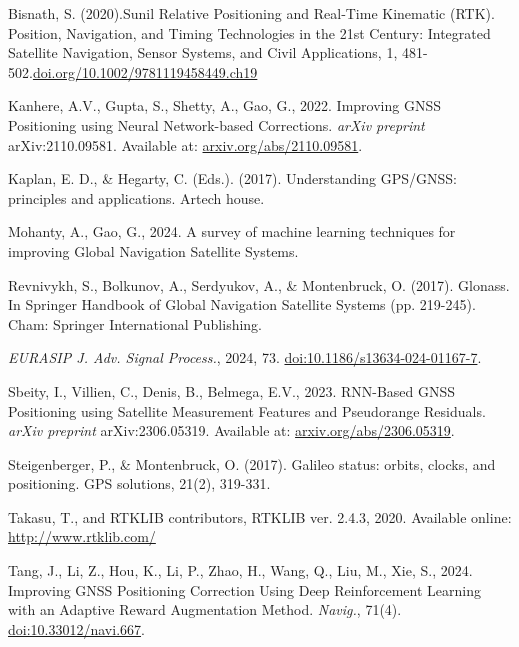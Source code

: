 \documentclass{isprs} %
\begin{document}
\begin{thebibliography}{}
\label{BisnathSunil} 
Bisnath, S. (2020).Sunil Relative Positioning and Real‐Time Kinematic (RTK). Position, Navigation, and Timing Technologies in the 21st Century: Integrated Satellite Navigation, Sensor Systems, and Civil Applications, 1, 481-502.\href{https://doi.org/10.1002/9781119458449.ch19}{doi.org/10.1002/9781119458449.ch19}

\label{kanhere2022} 
Kanhere, A.V., Gupta, S., Shetty, A., Gao, G., 2022. Improving GNSS Positioning using Neural Network-based Corrections. 
\textit{arXiv preprint} arXiv:2110.09581. 
Available at: \href{https://arxiv.org/abs/2110.09581}{arxiv.org/abs/2110.09581}.

\label{KaplanHegarty}
Kaplan, E. D., \& Hegarty, C. (Eds.). (2017). Understanding GPS/GNSS: principles and applications. Artech house.

\label{mohanty2024} 
Mohanty, A., Gao, G., 2024. A survey of machine learning techniques for improving Global Navigation Satellite Systems. 

\label{RevnivykhSergey} 
Revnivykh, S., Bolkunov, A., Serdyukov, A., \& Montenbruck, O. (2017). Glonass. In Springer Handbook of Global Navigation Satellite Systems (pp. 219-245). Cham: Springer International Publishing.

\textit{EURASIP J. Adv. Signal Process.}, 2024, 73. 
\href{https://doi.org/10.1186/s13634-024-01167-7}{doi:10.1186/s13634-024-01167-7}.

\label{sbeity2023} 
Sbeity, I., Villien, C., Denis, B., Belmega, E.V., 2023. RNN-Based GNSS Positioning using Satellite Measurement Features and Pseudorange Residuals. 
\textit{arXiv preprint} arXiv:2306.05319. 
Available at: \href{https://arxiv.org/abs/2306.05319}{arxiv.org/abs/2306.05319}.

\label{SteigenbergerPeter}
Steigenberger, P., \& Montenbruck, O. (2017). Galileo status: orbits, clocks, and positioning. GPS solutions, 21(2), 319-331.

\label{Takasu2020}
Takasu, T., and RTKLIB contributors, RTKLIB ver. 2.4.3, 2020. Available online: \href{http://www.rtklib.com/}{http://www.rtklib.com/}


\label{tang2024} 
Tang, J., Li, Z., Hou, K., Li, P., Zhao, H., Wang, Q., Liu, M., Xie, S., 2024. Improving GNSS Positioning Correction Using Deep Reinforcement Learning with an Adaptive Reward Augmentation Method. 
\textit{Navig.}, 71(4). 
\href{https://doi.org/10.33012/navi.667}{doi:10.33012/navi.667}.


\end{thebibliography}
\end{document}
